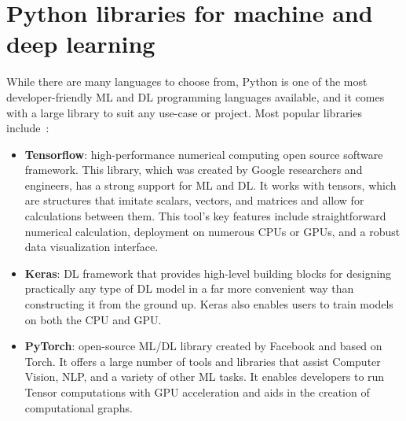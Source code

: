 \section{Python libraries for machine and deep learning}\label{sec:ML_DL_libraries}

While there are many languages to choose from, Python is one of the most developer-friendly \gls{ML} and \gls{DL} programming languages available, and it comes with a large library to suit any use-case or project. Most popular libraries include~\cite{JonssonWaysDevelopment,Paszke2019PyTorch:Library}:

\begin{itemize}
    \item \textbf{Tensorflow}: high-performance numerical computing open source software framework. This library, which was created by Google researchers and engineers, has a strong support for \gls{ML} and \gls{DL}. It works with tensors, which are structures that imitate scalars, vectors, and matrices and allow for calculations between them. This tool's key features include straightforward numerical calculation, deployment on numerous CPUs or \gls{GPU}s, and a robust data visualization interface.
    \item \textbf{Keras}: \gls{DL} framework that provides high-level building blocks for designing practically any type of \gls{DL} model in a far more convenient way than constructing it from the ground up. Keras also enables users to train models on both the CPU and \gls{GPU}.
    \item \textbf{PyTorch}: open-source \gls{ML}/\gls{DL} library created by Facebook and based on Torch. It offers a large number of tools and libraries that assist Computer Vision, \gls{NLP}, and a variety of other \gls{ML} tasks. It enables developers to run Tensor computations with \gls{GPU} acceleration and aids in the creation of computational graphs.
\end{itemize}